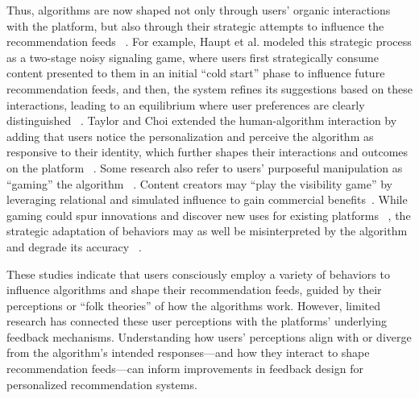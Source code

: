 Thus, algorithms are now shaped not only through users’ organic interactions with the platform, but also through their strategic attempts to influence the recommendation feeds ~\cite{lee2022algorithmic}. For example, Haupt et al. modeled this strategic process as a two-stage noisy signaling game, where users first strategically consume content presented to them in an initial ``cold start'' phase to influence future recommendation feeds, and then, the system refines its suggestions based on these interactions, leading to an equilibrium where user preferences are clearly distinguished ~\cite{haupt2023recommending}. Taylor and Choi extended the human-algorithm interaction by adding that users notice the personalization and perceive the algorithm as responsive to their identity, which further shapes their interactions and outcomes on the platform ~\cite{taylor2022initial}. Some research also refer to users' purposeful manipulation as ``gaming'' the algorithm ~\cite{petre2019gaming,SHEPHERD2020102572, hardt2016strategic}. Content creators may ``play the visibility game'' by leveraging relational and simulated influence to gain commercial benefits~\cite{cotter2019playing}. While gaming could spur innovations and discover new uses for existing platforms ~\cite{bambauer2018algorithm}, the strategic adaptation of behaviors may as well be misinterpreted by the algorithm and degrade its accuracy ~\cite{Cen_Ilyas_Allen_Li_Madry_2024}.

These studies indicate that users consciously employ a variety of behaviors to influence algorithms and shape their recommendation feeds, guided by their perceptions or ``folk theories'' of how the algorithms work. However, limited research has connected these user perceptions with the platforms' underlying feedback mechanisms. Understanding how users' perceptions align with or diverge from the algorithm's intended responses---and how they interact to shape recommendation feeds---can inform improvements in feedback design for personalized recommendation systems.

